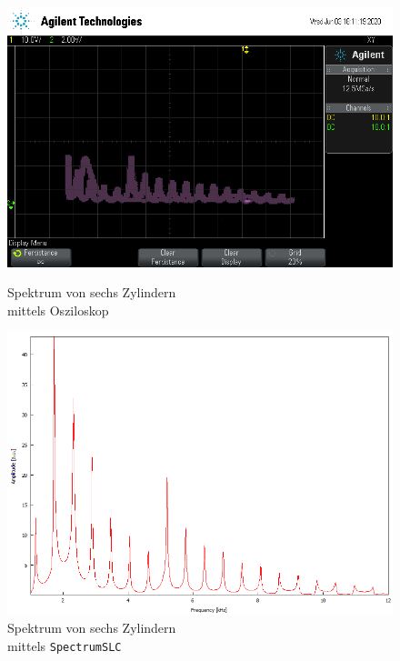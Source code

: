 \begin{figure}
    \begin{minipage}[b]{.4\linewidth} %
        \includegraphics[width=\linewidth]{figure/6Zylinder.png}
        \vspace*{0.008cm}
        \caption{Spektrum von sechs Zylindern\\ mittels Osziloskop}
     \end{minipage}
     \hspace{.1\linewidth}%
     \begin{minipage}[b]{.4\linewidth} %
        \includegraphics[width=\linewidth]{figure/6_Zylinder.png}
        \caption{Spektrum von sechs Zylindern\\ mittels \texttt{SpectrumSLC}}
     \end{minipage}
\end{figure}
\FloatBarrier

